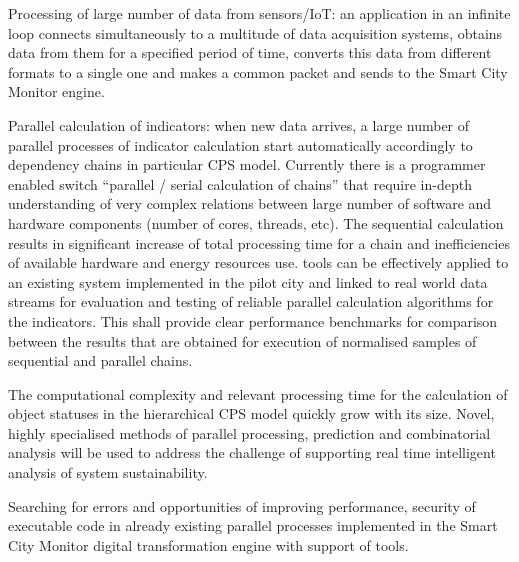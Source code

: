 \begin{Workpackage}{\thewpno}
\begin{Task}
\begin{compactitem}
\item	Processing of large number of data from sensors/IoT: an application in an 
infinite loop connects simultaneously to a multitude of data acquisition systems, 
obtains data from them for a specified period of time, converts this data from 
different formats to a single one and makes a common packet and sends to the 
Smart City Monitor engine.
\item	Parallel calculation of indicators: when new data arrives, a large number of 
parallel processes of indicator calculation start automatically accordingly to 
dependency chains in particular CPS model. Currently there is a programmer enabled 
switch ``parallel / serial calculation of chains'' that require in-depth understanding 
of very complex relations between large number of software and hardware components 
(number of cores, threads, etc). The sequential calculation results in significant 
increase of total processing time 
 for a chain and inefficiencies of available hardware 
and energy resources use. \TheProject tools can be effectively applied to an existing 
system implemented in the pilot city and linked to real world data streams for 
evaluation and testing of reliable parallel calculation algorithms for the indicators. 
This shall provide clear performance benchmarks for comparison between the results 
that are obtained for execution of normalised samples of sequential and parallel chains.
\end{compactitem}
\taskbreak
\begin{compactitem}
\item	The computational complexity and relevant processing time for the calculation 
of object statuses in the hierarchical CPS model quickly grow with its size. 
Novel, highly specialised methods of 
parallel processing, prediction and 
combinatorial analysis will be used to address the challenge of supporting real time intelligent analysis of system sustainability.    
\item Searching for errors and opportunities of improving performance, 
security of executable code in already existing parallel processes implemented in 
the Smart City Monitor digital transformation engine with support of \TheProject 
tools.
\end{compactitem}


\end{Task}
\end{Workpackage}
